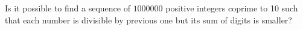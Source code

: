 \problem
Is it possible to find a sequence of $1000000$ positive integers coprime to
10 such that each number is divisible by previous one but its sum of digits is
smaller?
\solution
\endproblem
